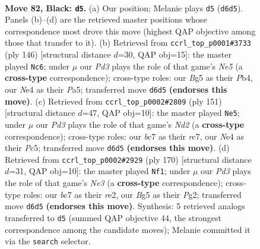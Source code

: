 \documentclass[11pt]{article}
\begin{document}
\clearpage

\begin{figure}[p]\centering
\begin{subfigure}{0.46\textwidth}\centering
\resizebox{\linewidth}{!}{%
\newchessgame
\chessboard[
  setfen={8/2B5/3pk2p/4p1b1/1K2n2p/5r2/1R6/8 b - - 1 82},
  showmover=false,
  pgfstyle=straightmove, color=movearrow, markmove={d6-d5}
]}
\caption{}
\end{subfigure}\hfill
\begin{subfigure}{0.46\textwidth}\centering
\resizebox{\linewidth}{!}{%
\newchessgame
\chessboard[
  setfen={8/2k5/8/PK1BN3/1PP5/6b1/8/r7 w - - 15 74},
  showmover=false,
  pgfstyle=straightmove, color=movearrow, markmove={e5-c6}
]}
\caption{}
\end{subfigure}
\\[4pt]
\begin{subfigure}{0.46\textwidth}\centering
\resizebox{\linewidth}{!}{%
\newchessgame
\chessboard[
  setfen={8/2Rn1b2/4pk2/2p3p1/B1P5/4K3/7P/8 b - - 28 76},
  showmover=false,
  pgfstyle=straightmove, color=movearrow, markmove={d7-e5}
]}
\caption{}
\end{subfigure}\hfill
\begin{subfigure}{0.46\textwidth}\centering
\resizebox{\linewidth}{!}{%
\newchessgame
\chessboard[
  setfen={8/1bB4p/1P2k3/8/7P/4NPK1/4r1P1/8 w - - 77 86},
  showmover=false,
  pgfstyle=straightmove, color=movearrow, markmove={e3-f1}
]}
\caption{}
\end{subfigure}
\caption{\textbf{Move 82, Black: \texttt{d5}.} (a) Our position; Melanie plays \texttt{d5} (\texttt{d6d5}). Panels (b)--(d) are the retrieved master positions whose correspondence most drove this move (highest QAP objective among those that transfer to it). (b) Retrieved from \texttt{ccrl\_top\_p0001\#3733} (ply 146) [structural distance $d$=30, QAP obj=15]: the master played \texttt{Nc6}; under $\mu$ our \emph{Pd3} plays the role of that game's \emph{Ne5} (a \textbf{cross-type} correspondence); cross-type roles: our \emph{B}g5 as their \emph{P}b4, our \emph{N}e4 as their \emph{P}a5; transferred move \texttt{d6d5} \textbf{(endorses this move)}. (c) Retrieved from \texttt{ccrl\_top\_p0002\#2809} (ply 151) [structural distance $d$=47, QAP obj=10]: the master played \texttt{Ne5}; under $\mu$ our \emph{Pd3} plays the role of that game's \emph{Nd2} (a \textbf{cross-type} correspondence); cross-type roles: our \emph{b}c7 as their \emph{r}c7, our \emph{N}e4 as their \emph{P}c5; transferred move \texttt{d6d5} \textbf{(endorses this move)}. (d) Retrieved from \texttt{ccrl\_top\_p0002\#2929} (ply 170) [structural distance $d$=31, QAP obj=10]: the master played \texttt{Nf1}; under $\mu$ our \emph{Pd3} plays the role of that game's \emph{Ne3} (a \textbf{cross-type} correspondence); cross-type roles: our \emph{b}c7 as their \emph{r}e2, our \emph{B}g5 as their \emph{P}g2; transferred move \texttt{d6d5} \textbf{(endorses this move)}. Synthesis: 5 retrieved analogs transferred to \texttt{d5} (summed QAP objective 44, the strongest correspondence among the candidate moves); Melanie committed it via the \texttt{search} selector.}
\label{fig:thought-m163}
\end{figure}
\end{document}
